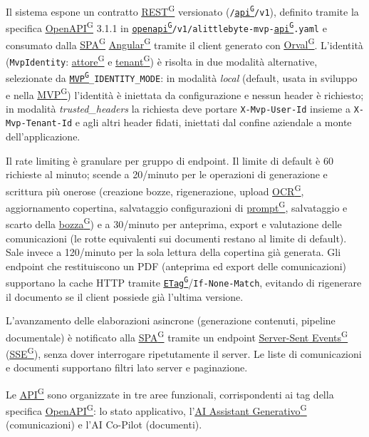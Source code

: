 \documentclass[a4paper,12pt]{article}
\providecommand{\glslink}[2]{\href{https://alittlebyte-19.github.io/Documentazione/glossario.html\#gls-#1}{\underline{#2}\textsuperscript{\scriptsize G}}}
\begin{document}
Il sistema espone un contratto \glslink{rest-representational-state-transfer}{REST} versionato (\texttt{/\glslink{api-application-programming-interface}{api}/v1}), definito tramite la specifica \glslink{openapi}{OpenAPI} 3.1.1 in \texttt{\glslink{openapi}{openapi}/v1/alittlebyte-mvp-\glslink{api-application-programming-interface}{api}.yaml} e consumato dalla \glslink{spa-single-page-application}{SPA} \glslink{angular}{Angular} tramite il client generato con \glslink{orval}{Orval}. L'identità (\texttt{MvpIdentity}: \glslink{attore}{attore} e \glslink{tenant}{tenant}) è risolta in due modalità alternative, selezionate da \texttt{\glslink{mvp-minimum-viable-product}{MVP}\_IDENTITY\_MODE}: in modalità \textit{local} (default, usata in sviluppo e nella \glslink{mvp-minimum-viable-product}{MVP}) l'identità è iniettata da configurazione e nessun header è richiesto; in modalità \textit{trusted\_headers} la richiesta deve portare \texttt{X-Mvp-User-Id} insieme a \texttt{X-Mvp-Tenant-Id} e agli altri header fidati, iniettati dal confine aziendale a monte dell'applicazione.

Il rate limiting è granulare per gruppo di endpoint. Il limite di default è 60 richieste al minuto; scende a 20/minuto per le operazioni di generazione e scrittura più onerose (creazione bozze, rigenerazione, upload \glslink{ocr-riconoscimento-ottico-dei-caratteri}{OCR}, aggiornamento copertina, salvataggio configurazioni di \glslink{prompt}{prompt}, salvataggio e scarto della \glslink{bozza-draft}{bozza}) e a 30/minuto per anteprima, export e valutazione delle comunicazioni (le rotte equivalenti sui documenti restano al limite di default). Sale invece a 120/minuto per la sola lettura della copertina già generata. Gli endpoint che restituiscono un PDF (anteprima ed export delle comunicazioni) supportano la cache HTTP tramite \texttt{\glslink{etag}{ETag}}/\texttt{If-None-Match}, evitando di rigenerare il documento se il client possiede già l'ultima versione.

L'avanzamento delle elaborazioni asincrone (generazione contenuti, pipeline documentale) è notificato alla \glslink{spa-single-page-application}{SPA} tramite un endpoint \glslink{sse-server-sent-events}{Server-Sent Events} (\glslink{sse-server-sent-events}{SSE}), senza dover interrogare ripetutamente il server. Le liste di comunicazioni e documenti supportano filtri lato server e paginazione.

Le \glslink{api-application-programming-interface}{API} sono organizzate in tre aree funzionali, corrispondenti ai tag della specifica \glslink{openapi}{OpenAPI}: lo stato applicativo, l'\glslink{ai-assistant-generativo}{AI Assistant Generativo} (comunicazioni) e l'AI Co-Pilot (documenti).
\end{document}
